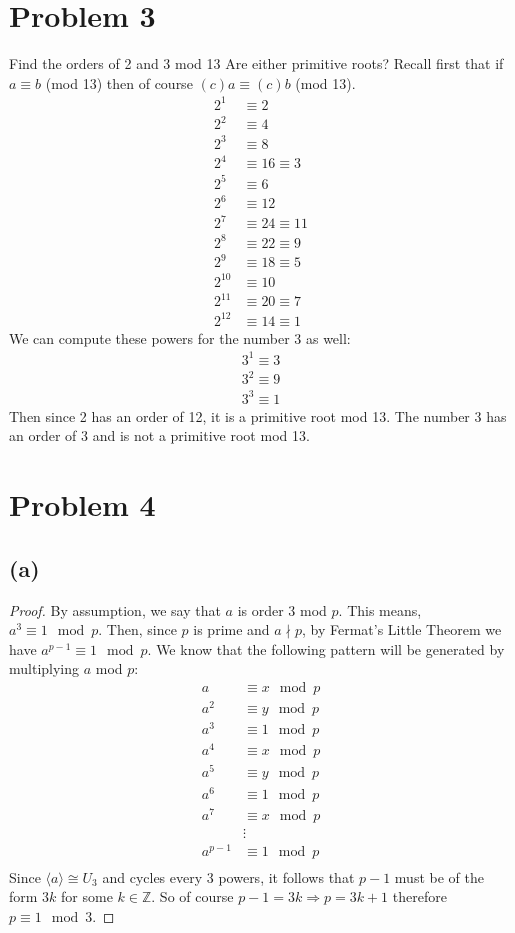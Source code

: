 \documentclass{article}
\theoremstyle{definition}
\begin{document}
\section*{Problem 3}
Find the orders of 2 and 3 mod 13 Are either primitive roots? Recall first that if $a \equiv b$ (mod 13) then of course
$(c)a \equiv (c)b$ (mod 13).
\begin{align*}
    2^1 & \equiv 2 \\
    2^2 & \equiv 4 \\
    2^3 & \equiv 8 \\
    2^4 & \equiv 16 \equiv 3 \\
    2^5 & \equiv 6 \\
    2^6 & \equiv 12 \\
    2^7 & \equiv 24 \equiv 11 \\
    2^8 & \equiv 22 \equiv 9 \\
    2^9 & \equiv 18 \equiv 5 \\
    2^{10} & \equiv 10 \\
    2^{11} & \equiv 20 \equiv 7 \\
    2^{12} & \equiv 14 \equiv 1
\end{align*}
We can compute these powers for the number 3 as well:
\begin{align*}
    3^1 \equiv 3 \\
    3^2 \equiv 9 \\
    3^3 \equiv 1
\end{align*}
Then since 2 has an order of 12, it is a primitive root mod 13. The number 3 has an order of 3 and is not a primitive root mod 13.
\section*{Problem 4}
\subsection*{(a)}
\begin{proof}
    By assumption, we say that $a$ is order 3 mod $p$. This means, $a^3 \equiv 1 \mod{p}$. Then,
    since $p$ is prime and $a \nmid p$, by Fermat's Little Theorem we have $a^{p - 1} \equiv 1 \mod{p}$.
    We know that the following pattern will be generated by multiplying $a$ mod $p$:
    \begin{align*}
        a & \equiv x \mod{p} \\
        a^2 &\equiv y \mod{p} \\
        a^3 &\equiv 1 \mod{p} \\
        a^4 &\equiv x \mod{p} \\
        a^5 &\equiv y \mod{p}\\
        a^6 &\equiv 1 \mod{p}\\
        a^7 &\equiv x \mod{p}\\
        &\vdots \\
        a^{p-1} &\equiv 1 \mod{p}\\
    \end{align*}
    Since $\langle a \rangle \cong U_3$ and cycles every 3 powers, it follows that $p-1$ must be of the form $3k$ for some $k \in \mathbb{Z}$.
    So of course $p - 1 = 3k \Longrightarrow p = 3k + 1$ therefore $p \equiv 1 \mod{3}$.
\end{proof}
\end{document}

